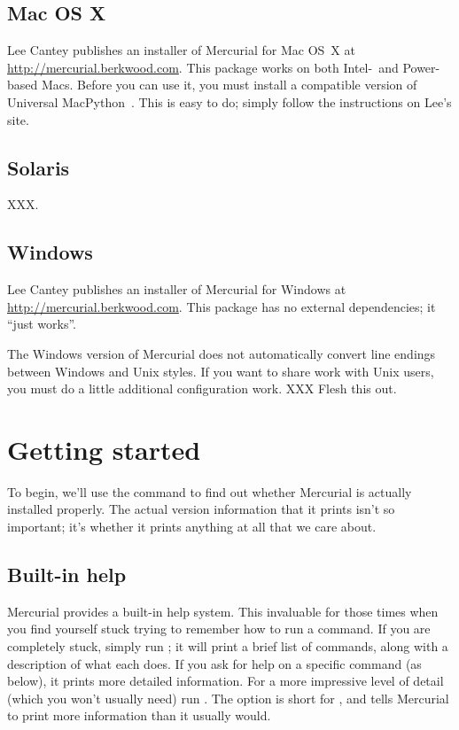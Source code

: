 \subsection{Mac OS X}

Lee Cantey publishes an installer of Mercurial for Mac OS~X at
\url{http://mercurial.berkwood.com}.  This package works on both
Intel-~and Power-based Macs.  Before you can use it, you must install
a compatible version of Universal MacPython~\cite{web:macpython}.  This
is easy to do; simply follow the instructions on Lee's site.

\subsection{Solaris}

XXX.

\subsection{Windows}

Lee Cantey publishes an installer of Mercurial for Windows at
\url{http://mercurial.berkwood.com}.  This package has no external
dependencies; it ``just works''.

\begin{note}
  The Windows version of Mercurial does not automatically convert line
  endings between Windows and Unix styles.  If you want to share work
  with Unix users, you must do a little additional configuration
  work. XXX Flesh this out.
\end{note}

\section{Getting started}

To begin, we'll use the  command to find out whether
Mercurial is actually installed properly.  The actual version
information that it prints isn't so important; it's whether it prints
anything at all that we care about.

\subsection{Built-in help}

Mercurial provides a built-in help system.  This invaluable for those
times when you find yourself stuck trying to remember how to run a
command.  If you are completely stuck, simply run ; it
will print a brief list of commands, along with a description of what
each does.  If you ask for help on a specific command (as below), it
prints more detailed information.
For a more impressive level of detail (which you won't usually need)
run .  The  option is short
for , and tells Mercurial to print more information
than it usually would.

